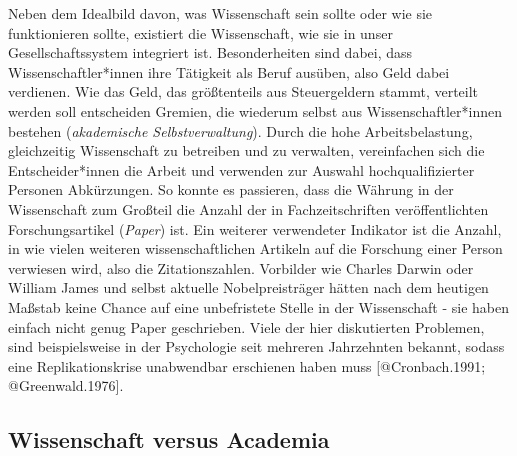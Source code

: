 \documentclass[
  letterpaper,
  DIV=11,
  numbers=noendperiod]{scrreprt}
\begin{document}
Neben dem Idealbild davon, was Wissenschaft sein sollte oder wie sie
funktionieren sollte, existiert die Wissenschaft, wie sie in unser
Gesellschaftssystem integriert ist. Besonderheiten sind dabei, dass
Wissenschaftler*innen ihre Tätigkeit als Beruf ausüben, also Geld dabei
verdienen. Wie das Geld, das größtenteils aus Steuergeldern stammt,
verteilt werden soll entscheiden Gremien, die wiederum selbst aus
Wissenschaftler*innen bestehen (\emph{akademische Selbstverwaltung}).
Durch die hohe Arbeitsbelastung, gleichzeitig Wissenschaft zu betreiben
und zu verwalten, vereinfachen sich die Entscheider*innen die Arbeit und
verwenden zur Auswahl hochqualifizierter Personen Abkürzungen. So konnte
es passieren, dass die Währung in der Wissenschaft zum Großteil die
Anzahl der in Fachzeitschriften veröffentlichten Forschungsartikel
(\emph{Paper}) ist. Ein weiterer verwendeter Indikator ist die Anzahl,
in wie vielen weiteren wissenschaftlichen Artikeln auf die Forschung
einer Person verwiesen wird, also die Zitationszahlen. Vorbilder wie
Charles Darwin oder William James und selbst aktuelle Nobelpreisträger
hätten nach dem heutigen Maßstab keine Chance auf eine unbefristete
Stelle in der Wissenschaft - sie haben einfach nicht genug Paper
geschrieben. Viele der hier diskutierten Problemen, sind beispielsweise
in der Psychologie seit mehreren Jahrzehnten bekannt, sodass eine
Replikationskrise unabwendbar erschienen haben muss {[}@Cronbach.1991;
@Greenwald.1976{]}.

\subsection{Wissenschaft versus
Academia}\label{wissenschaft-versus-academia}
\end{document}

